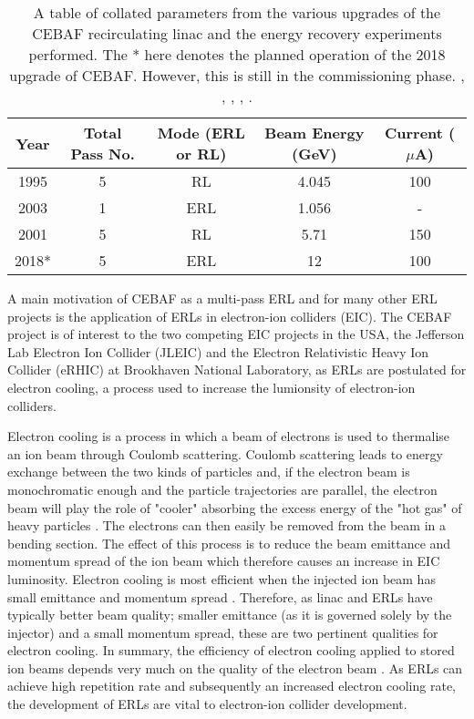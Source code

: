 \documentclass[11pt]{article}
\begin{document}
\begin{table}[H]
\centering
\begin{tabular}{|c||c|c|c|c|}
\hline
Year & Total Pass No. & Mode (ERL or RL) & Beam Energy (GeV) & Current ($\mu$A) \\
\hline
1995 & 5 & RL & 4.045 & 100 \\
\hline
2003 & 1 & ERL & 1.056 & - \\
\hline
2001 & 5 & RL & 5.71 & 150 \\
\hline
2018* & 5 & ERL & 12 & 100 \\
\hline
\end{tabular}
\caption{\label{tab:CEBAFparam} A table of collated parameters from the various upgrades of the CEBAF recirculating linac and the energy recovery experiments performed. The * here denotes the planned operation of the 2018 upgrade of CEBAF. However, this is still in the commissioning phase. \cite{CEBAFRLegg}, \cite{CEBAF1stER}, \cite{CEBAFYChao}, \cite{CEBAFLeemann}, \cite{CEBAFFMeot}.}
\end{table}

A main motivation of CEBAF as a multi-pass ERL and for many other ERL projects is the application of ERLs in electron-ion colliders (EIC). The CEBAF project is of interest to the two competing EIC projects in the USA, the Jefferson Lab Electron Ion Collider (JLEIC) \cite{JLEIC} and the Electron Relativistic Heavy Ion Collider  (eRHIC) \cite{eRHIC} at Brookhaven National Laboratory, as ERLs are postulated for electron cooling, a process used to increase the lumionsity of electron-ion colliders.

Electron cooling is a process in which a beam of electrons is used to thermalise an ion beam through Coulomb scattering. Coulomb scattering leads to energy exchange between the two kinds of particles and, if the electron beam is monochromatic enough and the particle trajectories are parallel, the electron beam will play the role of "cooler" absorbing the excess energy of the "hot gas" of heavy particles \cite{Budkerecool}. The electrons can then easily be removed from the beam in a bending section. The effect of this process is to reduce the beam emittance and momentum spread \cite{CERNEC} of the ion beam which therefore causes an increase in EIC luminosity. Electron cooling is most efficient when the injected ion beam has small emittance and momentum spread \cite{ESREC}. Therefore, as linac and ERLs have typically better beam quality; smaller emittance (as it is governed solely by the injector) and a small momentum spread, these are two pertinent qualities for electron cooling. In summary, the efficiency of electron cooling applied to stored ion beams depends very much on the quality of the electron beam \cite{PothEC}. As ERLs can achieve high repetition rate and subsequently an increased electron cooling rate, the development of ERLs are vital to electron-ion collider development.
\end{document}
